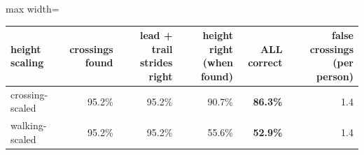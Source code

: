 \begin{adjustbox}{max width=\textwidth}
{\footnotesize
\begin{tabular}{lrrrrr}
\toprule
\textbf{height scaling} & \textbf{crossings found} & \textbf{lead + trail strides right} & \textbf{height right (when found)} & \textbf{ALL correct} & \textbf{false crossings (per person)} \\
\midrule
crossing-scaled & 95.2\% & 95.2\% & 90.7\% & \textbf{86.3\%} & 1.4 \\
walking-scaled & 95.2\% & 95.2\% & 55.6\% & \textbf{52.9\%} & 1.4 \\
\bottomrule
\end{tabular}
}
\end{adjustbox}
